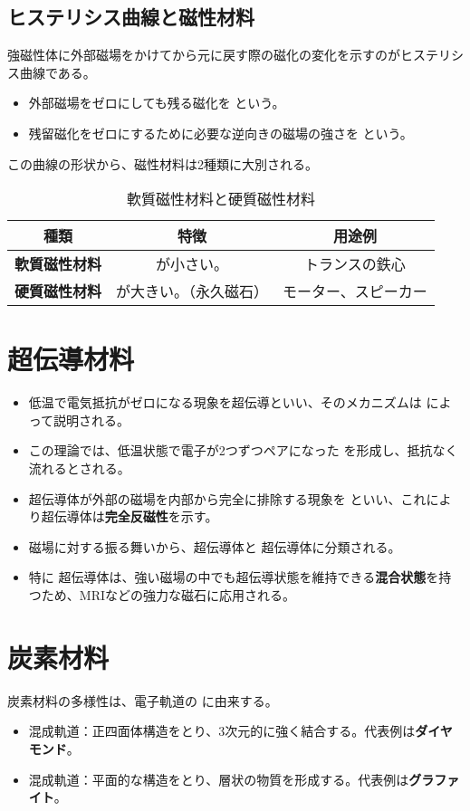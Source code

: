 \documentclass[11pt,a4paper]{ltjsarticle}
\newcommand{\blank}{\underline{\hspace{3cm}}}
\begin{document}
\subsection{ヒステリシス曲線と磁性材料}
強磁性体に外部磁場をかけてから元に戻す際の磁化の変化を示すのがヒステリシス曲線である。
\begin{itemize}
    \item 外部磁場をゼロにしても残る磁化を \blank という。
    \item 残留磁化をゼロにするために必要な逆向きの磁場の強さを \blank という。
\end{itemize}

この曲線の形状から、磁性材料は2種類に大別される。
\begin{table}[H]
    \centering
    \caption{軟質磁性材料と硬質磁性材料}
    \begin{tabular}{c|c|c}
        \toprule
        種類 & 特徴 & 用途例 \\
        \midrule
        \textbf{軟質磁性材料} & \blank が小さい。 & トランスの鉄心 \\
        \textbf{硬質磁性材料} & \blank が大きい。（永久磁石） & モーター、スピーカー \\
        \bottomrule
    \end{tabular}
\end{table}

\section{超伝導材料}
\begin{itemize}
    \item 低温で電気抵抗がゼロになる現象を超伝導といい、そのメカニズムは \blank によって説明される。
    \item この理論では、低温状態で電子が2つずつペアになった \blank を形成し、抵抗なく流れるとされる。
    \item 超伝導体が外部の磁場を内部から完全に排除する現象を \blank といい、これにより超伝導体は\textbf{完全反磁性}を示す。
    \item 磁場に対する振る舞いから、\blank 超伝導体と \blank 超伝導体に分類される。
    \item 特に \blank 超伝導体は、強い磁場の中でも超伝導状態を維持できる\textbf{混合状態}を持つため、MRIなどの強力な磁石に応用される。
\end{itemize}

\section{炭素材料}
炭素材料の多様性は、電子軌道の \blank に由来する。
\begin{itemize}
    \item \blank 混成軌道：正四面体構造をとり、3次元的に強く結合する。代表例は\textbf{ダイヤモンド}。
    \item \blank 混成軌道：平面的な構造をとり、層状の物質を形成する。代表例は\textbf{グラファイト}。
\end{itemize}
\end{document}

